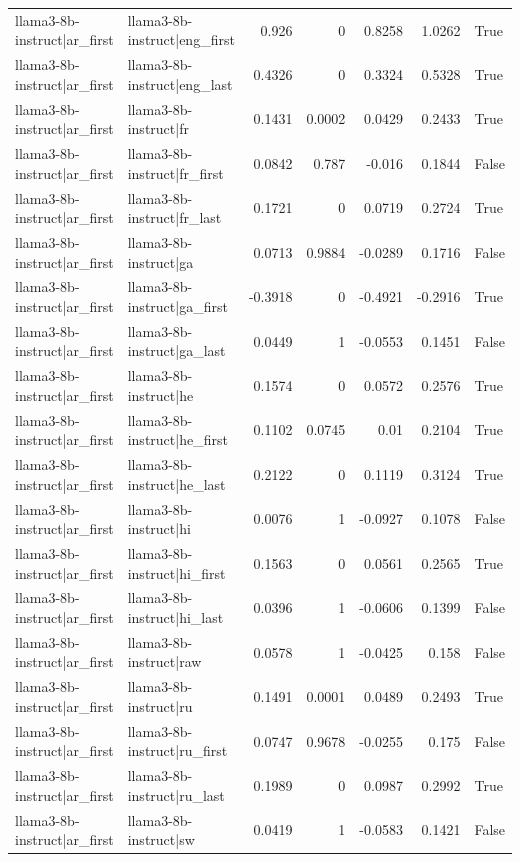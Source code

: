 \begin{table}
\begin{tabular}{l l r r r r l}
llama3-8b-instruct|ar_first & llama3-8b-instruct|eng_first & 0.926 & 0 & 0.8258 & 1.0262 & True \\
llama3-8b-instruct|ar_first & llama3-8b-instruct|eng_last & 0.4326 & 0 & 0.3324 & 0.5328 & True \\
llama3-8b-instruct|ar_first & llama3-8b-instruct|fr & 0.1431 & 0.0002 & 0.0429 & 0.2433 & True \\
llama3-8b-instruct|ar_first & llama3-8b-instruct|fr_first & 0.0842 & 0.787 & -0.016 & 0.1844 & False \\
llama3-8b-instruct|ar_first & llama3-8b-instruct|fr_last & 0.1721 & 0 & 0.0719 & 0.2724 & True \\
llama3-8b-instruct|ar_first & llama3-8b-instruct|ga & 0.0713 & 0.9884 & -0.0289 & 0.1716 & False \\
llama3-8b-instruct|ar_first & llama3-8b-instruct|ga_first & -0.3918 & 0 & -0.4921 & -0.2916 & True \\
llama3-8b-instruct|ar_first & llama3-8b-instruct|ga_last & 0.0449 & 1 & -0.0553 & 0.1451 & False \\
llama3-8b-instruct|ar_first & llama3-8b-instruct|he & 0.1574 & 0 & 0.0572 & 0.2576 & True \\
llama3-8b-instruct|ar_first & llama3-8b-instruct|he_first & 0.1102 & 0.0745 & 0.01 & 0.2104 & True \\
llama3-8b-instruct|ar_first & llama3-8b-instruct|he_last & 0.2122 & 0 & 0.1119 & 0.3124 & True \\
llama3-8b-instruct|ar_first & llama3-8b-instruct|hi & 0.0076 & 1 & -0.0927 & 0.1078 & False \\
llama3-8b-instruct|ar_first & llama3-8b-instruct|hi_first & 0.1563 & 0 & 0.0561 & 0.2565 & True \\
llama3-8b-instruct|ar_first & llama3-8b-instruct|hi_last & 0.0396 & 1 & -0.0606 & 0.1399 & False \\
llama3-8b-instruct|ar_first & llama3-8b-instruct|raw & 0.0578 & 1 & -0.0425 & 0.158 & False \\
llama3-8b-instruct|ar_first & llama3-8b-instruct|ru & 0.1491 & 0.0001 & 0.0489 & 0.2493 & True \\
llama3-8b-instruct|ar_first & llama3-8b-instruct|ru_first & 0.0747 & 0.9678 & -0.0255 & 0.175 & False \\
llama3-8b-instruct|ar_first & llama3-8b-instruct|ru_last & 0.1989 & 0 & 0.0987 & 0.2992 & True \\
llama3-8b-instruct|ar_first & llama3-8b-instruct|sw & 0.0419 & 1 & -0.0583 & 0.1421 & False \\

\end{tabular}
\end{table}
